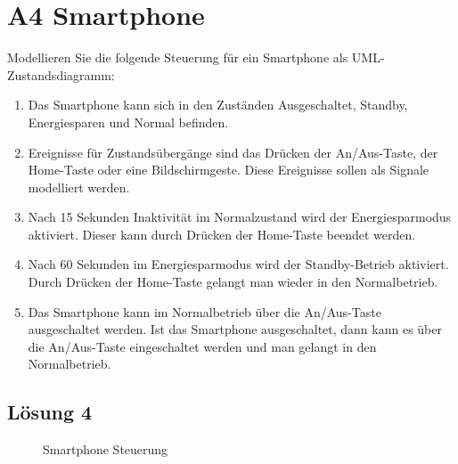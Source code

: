 \documentclass[main.tex]{subfiles}
\begin{document}
\section{A4 Smartphone}
Modellieren Sie die folgende Steuerung für ein Smartphone als UML-Zustandsdiagramm:

\begin{enumerate}
    \item Das Smartphone kann sich in den Zuständen Ausgeschaltet, Standby, Energiesparen und Normal befinden.
    \item Ereignisse für Zustandsübergänge sind das Drücken der An/Aus-Taste, der Home-Taste oder eine Bildschirmgeste. Diese Ereignisse sollen als Signale modelliert werden.
    \item Nach 15 Sekunden Inaktivität im Normalzustand wird der Energiesparmodus aktiviert. Dieser kann durch Drücken der Home-Taste beendet werden.
    \item Nach 60 Sekunden im Energiesparmodus wird der Standby-Betrieb aktiviert. Durch Drücken der Home-Taste gelangt man wieder in den Normalbetrieb.
    \item Das Smartphone kann im Normalbetrieb über die An/Aus-Taste ausgeschaltet werden. Ist das Smartphone ausgeschaltet, dann kann es über die An/Aus-Taste eingeschaltet werden und man gelangt in den Normalbetrieb.
\end{enumerate}

\subsection{Lösung 4}

\begin{figure}[h!]
    \caption{Smartphone Steuerung}
    \label{fig:lgs4}
\end{figure}
\end{document}
